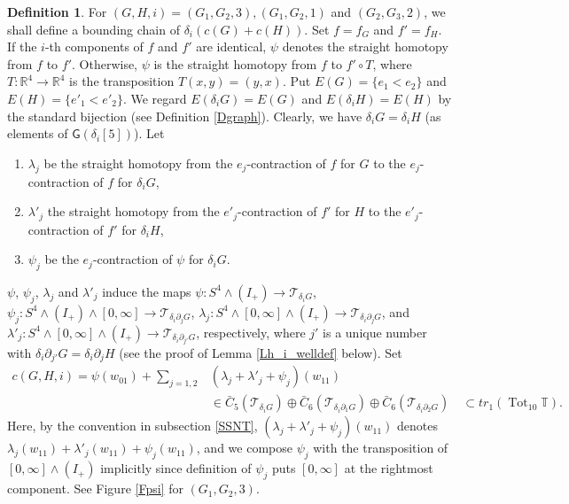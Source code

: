 \documentclass[reqno]{amsart}
\theoremstyle{definition}
\newtheorem{defi}{Definition}[section]
\theoremstyle{plain}
\newcommand{\TT}{\mathcal{T}} %
\newcommand{\TTH}{\mathbb{T}}%
\newcommand{\tot}{\operatorname{Tot}}%
\newcommand{\GG}{\mathsf{G}}%
\newcommand{\RR}{\mathbb{R}}
\begin{document}
\begin{defi}\label{Dchainhomotopy}
For $(G,H,i)=(G_1,G_2,3), (G_1,G_2,1)$ and $(G_2,G_3,2)$, we shall define a bounding chain of $\delta_i(c(G)+c(H))$. Set $f=f_G$ and $f'=f_H$. If the $i$-th components of $f$ and $f'$ are identical, $\psi$ denotes the straight homotopy from $f$ to $f'$. Otherwise, $\psi$ is the straight homotopy from $f$ to $f'\circ T$, where $T:\RR^4\to \RR^4$ is the transposition $T(x,y)=(y,x)$.
Put $E(G)=\{e_1<e_2\}$ and $E(H)=\{e'_1<e'_2\}$. We regard $E(\delta_iG)=E(G)$ and $E(\delta_iH)=E(H)$ by the standard bijection (see Definition \ref{Dgraph}). Clearly, we have $\delta_iG=\delta_iH$ (as elements of $\GG(\delta_i[5])$). Let 
\begin{enumerate}
\item $\lambda_j$ be the straight homotopy from the $e_j$-contraction of $f$ for $G$ to the  $e_j$-contraction of $f$ for $\delta_iG$,
\item $\lambda'_j$  the straight homotopy from the $e'_j$-contraction of $f'$ for $H$ to the  $e'_j$-contraction of $f'$ for $\delta_iH$,
\item $\psi_j$ be the $e_j$-contraction of $\psi$ for $\delta_iG$.
\end{enumerate} 
$\psi$, $\psi_j$, $\lambda_j$ and $\lambda'_j$ induce the maps $\psi:S^4\wedge(I_+)\to \TT_{\delta_iG}$, $\psi_j:S^4\wedge(I_+)\wedge[0,\infty]\to \TT_{\delta_i\partial_jG}$, $\lambda_j:S^4\wedge[0,\infty]\wedge (I_+)\to \TT_{\delta_i\partial_jG}$, and $\lambda'_j:S^4\wedge[0,\infty]\wedge (I_+)\to \TT_{\delta_i\partial_{j'}G}$, respectively, where $j'$ is a unique number with $\delta_i\partial_{j'}G=\delta_i\partial_{j}H$ (see the proof of Lemma \ref{Lh_i_welldef} below). 
Set
\[
\begin{split}
c(G,H,i)=\psi(w_{01})+\sum_{j=1,2}&(\lambda_j+\lambda'_j+\psi_j)(w_{11})\\
&\in \bar C_5(\TT_{\delta_iG})\oplus \bar C_6(\TT_{\delta_i\partial_1G})\oplus \bar C_6(\TT_{\delta_i\partial_2G})\quad \subset tr_1(\tot_{10}\TTH).
\end{split}
\]
Here, by the convention in subsection \ref{SSNT}, $(\lambda_j+\lambda'_j+\psi_j)(w_{11})$ denotes $\lambda_j(w_{11})+\lambda'_j(w_{11})+\psi_j(w_{11})$, and we compose $\psi_j$ with the transposition of $[0,\infty]\wedge (I_+)$ implicitly since definition of $\psi_j$ puts $[0,\infty]$ at the rightmost component. See Figure \ref{Fpsi} for $(G_1,G_2,3)$. 


\end{defi}
\end{document}
